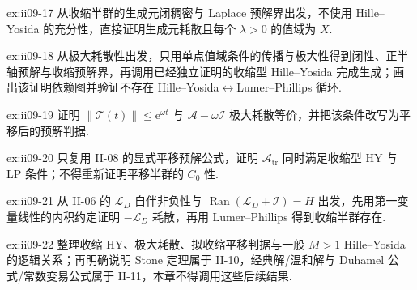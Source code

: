 \begin{FAExercise}{ex:ii09-17}
从收缩半群的生成元闭稠密与 Laplace 预解界出发，不使用 Hille--Yosida 的充分性，直接证明生成元耗散且每个 \(\displaystyle\lambda>0\) 的值域为 \(\displaystyle X\).
\end{FAExercise}

\begin{FAExercise}{ex:ii09-18}
从极大耗散性出发，只用单点值域条件的传播与极大性得到闭性、正半轴预解与收缩预解界，再调用已经独立证明的收缩型 Hille--Yosida 完成生成；画出该证明依赖图并验证不存在 Hille--Yosida\(\displaystyle\leftrightarrow\)Lumer--Phillips 循环.
\end{FAExercise}

\begin{FAExercise}[拟收缩的平移判据]{ex:ii09-19}
证明 \(\displaystyle\|\mathcal T(t)\|\leqslant\mathrm{e}^{\omega t}\) 与 \(\displaystyle\mathcal A-\omega\mathcal I\) 极大耗散等价，并把该条件改写为平移后的预解判据.
\end{FAExercise}

\begin{FAExercise}[平移半群的双准则审计]{ex:ii09-20}
只复用 II-08 的显式平移预解公式，证明 \(\displaystyle\mathcal A_{\mathrm{tr}}\) 同时满足收缩型 HY 与 LP 条件；不得重新证明平移半群的 \(\displaystyle C_0\) 性.
\end{FAExercise}

\begin{FAExercise}[热生成元的极大耗散性]{ex:ii09-21}
从 II-06 的 \(\displaystyle\mathcal L_D\) 自伴非负性与 \(\displaystyle\operatorname{Ran}(\mathcal L_D+\mathcal I)=H\) 出发，先用第一变量线性的内积约定证明 \(\displaystyle-\mathcal L_D\) 耗散，再用 Lumer--Phillips 得到收缩半群存在.
\end{FAExercise}

\begin{FAExercise}[HY、LP 与后续章节边界]{ex:ii09-22}
整理收缩 HY、极大耗散、拟收缩平移判据与一般 \(\displaystyle M>1\) Hille--Yosida 的逻辑关系；再明确说明 Stone 定理属于 II-10，经典解/温和解与 Duhamel 公式/常数变易公式属于 II-11，本章不得调用这些后续结果.
\end{FAExercise}
